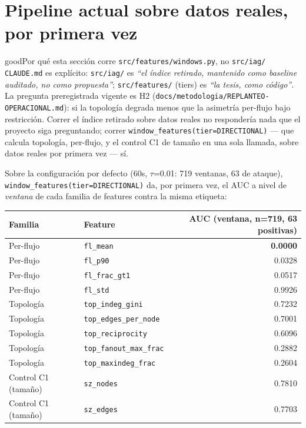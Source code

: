 \documentclass[11pt]{article}
\newcommand{\code}[1]{\texttt{\small #1}}
\begin{document}
\section{Pipeline actual sobre datos reales, por primera vez}
\label{sec:ddos-results}

\begin{cbox}{good}{Por qué esta sección corre \code{src/features/windows.py}, no \code{src/iag/}}
\code{CLAUDE.md} es explícito: \code{src/iag/} es \textit{``el índice retirado, mantenido
como baseline auditado, no como propuesta''}; \code{src/features/} (tiers) es
\textit{``la tesis, como código''}. La pregunta preregistrada vigente es H2
(\code{docs/metodologia/REPLANTEO-OPERACIONAL.md}): si la topología degrada menos que la
asimetría per-flujo bajo restricción. Correr el índice retirado sobre datos reales no
respondería nada que el proyecto siga preguntando; correr
\code{window\_features(tier=DIRECTIONAL)} --- que calcula topología, per-flujo, y el
control C1 de tamaño en una sola llamada, sobre datos reales por primera vez --- sí.
\end{cbox}

Sobre la configuración por defecto (60s, $\tau$=0.01: 719 ventanas, 63 de ataque),
\code{window\_features(tier=DIRECTIONAL)} da, por primera vez, el AUC a nivel de
\emph{ventana} de cada familia de features contra la misma etiqueta:

\begin{center}
\begin{tabular}{@{}llr@{}}
\toprule
\textbf{Familia} & \textbf{Feature} & \textbf{AUC (ventana, n=719, 63 positivas)} \\
\midrule
Per-flujo & \code{fl\_mean} & \textbf{0.0000} \\
Per-flujo & \code{fl\_p90} & 0.0328 \\
Per-flujo & \code{fl\_frac\_gt1} & 0.0517 \\
Per-flujo & \code{fl\_std} & 0.9926 \\
\midrule
Topología & \code{top\_indeg\_gini} & 0.7232 \\
Topología & \code{top\_edges\_per\_node} & 0.7001 \\
Topología & \code{top\_reciprocity} & 0.6096 \\
Topología & \code{top\_fanout\_max\_frac} & 0.2882 \\
Topología & \code{top\_maxindeg\_frac} & 0.2604 \\
\midrule
\rowcolor{crit!8} Control C1 (tamaño) & \code{sz\_nodes} & 0.7810 \\
\rowcolor{crit!8} Control C1 (tamaño) & \code{sz\_edges} & 0.7703 \\
\bottomrule
\end{tabular}
\end{center}
\end{document}
